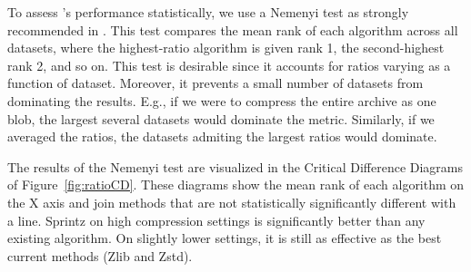To assess \mine's performance statistically, we use a Nemenyi test \cite{nemenyiTest} as strongly recommended in \cite{cdDiagrams}. This test compares the mean rank of each algorithm across all datasets, where the highest-ratio algorithm is given rank 1, the second-highest rank 2, and so on. This test is desirable since it accounts for ratios varying as a function of dataset. Moreover, it prevents a small number of datasets from dominating the results. E.g., if we were to compress the entire archive as one blob, the largest several datasets would dominate the metric. Similarly, if we averaged the ratios, the datasets admiting the largest ratios would dominate.

The results of the Nemenyi test are visualized in the Critical Difference Diagrams of Figure~\ref{fig:ratioCD}. These diagrams show the mean rank of each algorithm on the X axis and join methods that are not statistically significantly different with a line. Sprintz on high compression settings is significantly better than any existing algorithm. On slightly lower settings, it is still as effective as the best current methods (Zlib and Zstd).





